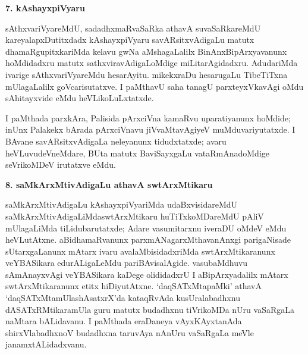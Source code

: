 \begin{center}
{\textbf{\Large 7. kAshayxpiVyaru}}
\end{center}

sAthxvariVyareMdU, sadadhxmaRvaSaRka athavA suvaSaRkareMdU kareyalapxDutitxdadx kAshayxpiVyaru savARsitxvAdigaLu matutx dhamaRgupitxkariMda kelavu gwNa aMshagaLalilx BinAnxBipArxyavanunx hoMdidadxru matutx sathxviravAdigaLoMdige miLitarAgidadxru. AdudariMda ivarige sAthxvariVyareMdu hesarAyitu. mikekxraDu hesarugaLu TibeTiTxna mUlagaLalilx goVcarisutatxve. I paMthavU saha tanagU parxteyxVkavAgi oMdu sAhitayxvide eMdu heVLikoLuLxtatxde.

I paMthada parxkAra, Palisida pArxciVna kamaRvu uparatiyanunx hoMdide; inUnx Palakekx bArada pArxciVnavu jiVvaMtavAgiyeV muMduvariyutatxde. I BAvane savARsitxvAdigaLa neleyanunx tidudxtatxde; avaru heVLuvudeVneMdare, BUta matutx BaviSayxgaLu vataRmAnadoMdige seVrikoMDeV irutatxve eMdu.

\begin{center}
{\textbf{\Large 8. saMkArxMtivAdigaLu athavA swtArxMtikaru}}
\end{center}

saMkArxMtivAdigaLu kAshayxpiVyariMda udaBxvisidareMdU saMkArxMtivAdigaLiMda\break swtArxMtikaru huTiTxkoMDareMdU pAliV mUlagaLiMda tiLidubarutatxde; Adare vasu\-mitarxnu iveraDU oMdeV eMdu heVLutAtxne. aBidhamaRvanunx parxmANagarxMthavanAnxgi parigaNisade sUtarxgaLanunx mAtarx ivaru avalaMbisidadxriMda swtArxMtikaranunx veYBASikara edurALigaLeMdu pariBAvisalAgide. vasubaMdhuvu sAmAnayxvAgi veYBASikara kaDege olididadxrU I aBipArxyadalilx mAtarx swtArxMtikaranunx etitx hiDiyutAtxne. `daqSATxMta\break\-paMki' athavA `daqSATxMtamUlashAsatxrX'da kataqRvAda kusUralabadhxnu dASATxRMtikara\break mUla guru matutx budadhxnu tiVrikoMDa nUru vaSaRgaLa naMtara bALidavanu. I paMthada eraDaneya vAyxKAyxtanAda shirxVlabadhxnoV budadhxna taruvAya nAnUru vaSaR\-gaLa meVle janamxtALidadxvanu.

